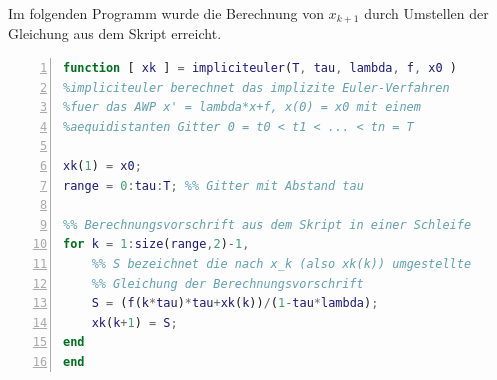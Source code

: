 \documentclass[11pt,a4paper,ngerman]{article}
\begin{document}
\newpage
Im folgenden Programm wurde die Berechnung von $x_{k+1}$ durch Umstellen der Gleichung aus dem Skript erreicht.

\begin{lstlisting}[language=matlab, numbers=left]
function [ xk ] = impliciteuler(T, tau, lambda, f, x0 )
%impliciteuler berechnet das implizite Euler-Verfahren
%fuer das AWP x' = lambda*x+f, x(0) = x0 mit einem
%aequidistanten Gitter 0 = t0 < t1 < ... < tn = T

xk(1) = x0;
range = 0:tau:T; %% Gitter mit Abstand tau

%% Berechnungsvorschrift aus dem Skript in einer Schleife
for k = 1:size(range,2)-1,
    %% S bezeichnet die nach x_k (also xk(k)) umgestellte
    %% Gleichung der Berechnungsvorschrift
    S = (f(k*tau)*tau+xk(k))/(1-tau*lambda);
    xk(k+1) = S;
end
end
\end{lstlisting}
\end{document}
